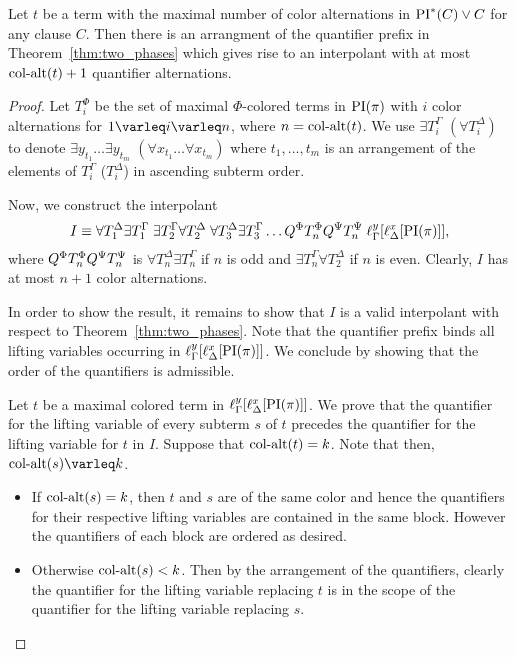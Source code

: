 \documentclass[%
	draft=false,%
	numbers=noendperiod,%
	11pt,%
	a4paper,%
	oneside,%
	openany,%
]{memoir}
\begin{document}
\begin{lemma}
	Let $t$ be a term with the maximal number of color alternations in $\operatorname{PI}^*(C) \lor C$ for any clause $C$.
	Then there is an arrangment of the quantifier prefix in Theorem~\ref{thm:two_phases} which gives rise to an interpolant 
	with at most $\operatorname{col-alt}(t)+1$ quantifier alternations.
\end{lemma}
\begin{proof}
	Let $T_i^\Phi$ be the set of maximal $\Phi$-colored terms in $\operatorname{PI}(\pi)$ with $i$ color alternations for $1\varleq i \varleq n$, where $n=\operatorname{col-alt}(t)$.
	We use $\exists T_i^\Gamma$ $(\forall T_i^\Delta)$ to denote $ \exists y_{t_1} \dots \exists y_{t_m}$ $(\forall x_{t_1}\dots\forall x_{t_m})$ where $t_1, \dots, t_m$ is an arrangement of the elements of $T_i^\Gamma$ ($T_i^\Delta$) in ascending subterm order. 


	Now, we construct the interpolant
	\[
		I \equiv 
		\forall T_1^\Delta \exists T_1^\Gamma \;
		\exists T_2^\Gamma \forall T_2^\Delta \;
		\forall T_3^\Delta \exists T_3^\Gamma
		\dots 
		Q^\Phi T_n^\Phi Q^\Psi T_n^\Psi
		\;
		\ell_{\Gamma}^{y}[\ell_{\Delta}^{x}[\operatorname{PI}(\pi)]],
	\]
	where $ Q^\Phi T_n^\Phi Q^\Psi T_n^\Psi $ is
	$\forall T_n^\Delta \exists T_n^\Gamma $ if $n$ is odd and 
	$\exists T_n^\Gamma \forall T_2^\Delta $ if $n$ is even.
	Clearly, $I$ has at most $n+1$ color alternations.

	In order to show the result, it remains to show that $I$ is a valid interpolant with respect to Theorem~\ref{thm:two_phases}. 
	Note that the quantifier prefix binds all lifting variables occurring in  
	$\ell_{\Gamma}^{y}[\ell_{\Delta}^{x}[\operatorname{PI}(\pi)]]$.
	We conclude by showing that the order of the quantifiers is admissible.

	Let $t$ be a maximal colored term in $\ell_{\Gamma}^{y}[\ell_{\Delta}^{x}[\operatorname{PI}(\pi)]]$. 
	We prove that the quantifier for the lifting variable of every subterm $s$ of $t$ precedes the quantifier for the lifting variable for $t$ in $I$.
	Suppose that $\operatorname{col-alt}(t) = k$. Note that then, $\ca(s) \varleq k$.
	\begin{itemize}
		\item
			If $\operatorname{col-alt}(s) = k$, then $t$ and $s$ are of the same color and hence the quantifiers for their respective lifting variables are contained in the same block. 
			However the quantifiers of each block are ordered as desired.
		\item
			Otherwise $\operatorname{col-alt}(s) < k$.
			Then by the arrangement of the quantifiers, clearly the quantifier for the lifting variable replacing $t$ is in the scope of the quantifier for the lifting variable replacing $s$.
			\qedhere
	\end{itemize}



\end{proof}
\end{document}
